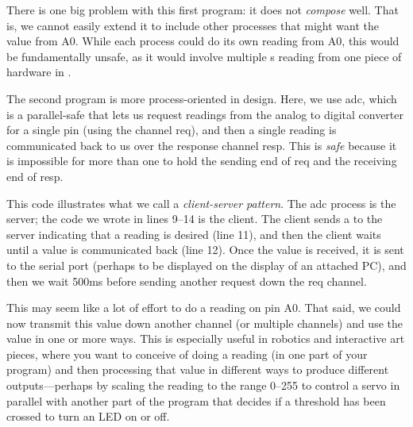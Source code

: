 There is one big problem with this first program: it does not {\em compose} well. That is, we cannot easily extend it to include other processes that might want the value from {\constant A0}. While each process could do its own reading from {\constant A0}, this would be fundamentally unsafe, as it would involve multiple {\PROC}s reading from one piece of hardware in \PARallel. 

The second program is more process-oriented in design. Here, we use {\code adc}, which is a parallel-safe \PROC that lets us request readings from the analog to digital converter for a single pin (using the \SIGNALT channel {\code req}), and then a single reading is communicated back to us over the response channel {\code resp}. This is \emph{safe} because it is impossible for more than one \PROC to hold the sending end of {\code req} and the receiving end of {\code resp}.

This code illustrates what we call a \emph{client-server pattern}. The {\code adc} process is the server; the code we wrote in lines 9--14 is the client. The client sends a \SIGNALV to the server indicating that a reading is desired (line 11), and then the client waits until a value is communicated back (line 12). Once the value is received, it is sent to the serial port (perhaps to be displayed on the display of an attached PC), and then we wait 500ms before sending another request down the {\code req} channel.

This may seem like a lot of effort to do a reading on pin {\constant A0}. That said, we could now transmit this value down another channel (or multiple channels) and use the value in one or more ways. This is especially useful in robotics and interactive art pieces, where you want to conceive of doing a reading (in one part of your program) and then processing that value in different ways to produce different outputs---perhaps by scaling the reading to the range 0--255 to control a servo in parallel with another part of the program that decides if a threshold has been crossed to turn an LED on or off.

\makingthingsbreak

\XXX

\seealso

\XXX